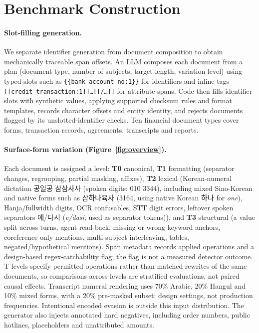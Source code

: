 \section{Benchmark Construction}
\label{sec:benchmark}

\paragraph{Slot-filling generation.}
We separate identifier generation from document composition to obtain mechanically traceable span offsets. An LLM composes each document from a plan (document type, number of subjects, target length, variation level) using typed slots such as \texttt{\{\{bank\_account\_no:1\}\}} for identifiers and inline tags \texttt{[[credit\_transaction:1]]…[[/…]]} for attribute spans. Code then fills identifier slots with synthetic values, applying supported checksum rules and format templates, records character offsets and entity identity, and rejects documents flagged by its unslotted-identifier checks. Ten financial document types cover forms, transaction records, agreements, transcripts and reports.

\paragraph{Surface-form variation (Figure~\ref{fig:overview}).}
Each document is assigned a level: \textbf{T0} canonical, \textbf{T1} formatting (separator changes, regrouping, partial masking, affixes), \textbf{T2} lexical (Korean-numeral dictation \textup{공일공 삼삼사사} (spoken digits: 010 3344), including mixed Sino-Korean and native forms such as \textup{삼하나육사} (3164, using native Korean \textup{하나} for \emph{one}), Hanja/fullwidth digits, OCR confusables, STT digit errors, leftover spoken separators \textup{에}/\textup{다시} (\emph{e/dasi}, used as separator tokens)), and \textbf{T3} structural (a value split across turns, agent read-back, missing or wrong keyword anchors, coreference-only mentions, multi-subject interleaving, tables, negated/hypothetical mentions). Span metadata records applied operations and a design-based regex-catchability flag; the flag is not a measured detector outcome. T levels specify permitted operations rather than matched rewrites of the same documents, so comparisons across levels are stratified evaluations, not paired causal effects. Transcript numeral rendering uses 70\% Arabic, 20\% Hangul and 10\% mixed forms, with a 20\% pre-masked subset: design settings, not production frequencies. Intentional encoded evasion is outside this input distribution. The generator also injects annotated hard negatives, including order numbers, public hotlines, placeholders and unattributed amounts.

